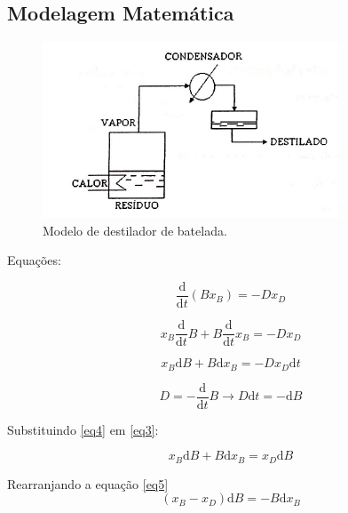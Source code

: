 \subsection{Modelagem Matemática}


\begin{figure}[H]
	\begin{center}
		\includegraphics[scale=0.7,trim={0cm -9 0 0}]{figuras/ladeq/destil/modelo}
		\vspace{-20pt}
		\caption{Modelo de destilador de batelada.}
		\label{ladeq/batelada}
	\end{center}
\end{figure}

Equações:


\begin{equation}\label{eq1}
\frac{\mathrm{d} }{\mathrm{d} t}(Bx_{B}) = -Dx_{D}
\end{equation}

\begin{equation}\label{eq2}
x_{B} \frac{\mathrm{d} }{\mathrm{d} t}B + B\frac{\mathrm{d} }{\mathrm{d} t}x_{B} = -Dx_{D}
\end{equation}

\begin{equation}\label{eq3}
x_{B} \mathrm{d} B + B \mathrm{d} x_{B} = -Dx_{D}\mathrm{d}t
\end{equation}

\begin{equation}\label{eq4}
D = -\frac{\mathrm{d} }{\mathrm{d} t}B \rightarrow D \mathrm{d} t = -\mathrm{d} B
\end{equation}

Substituindo \ref{eq4} em \ref{eq3}:

\begin{equation}\label{eq5}
x_{B}\mathrm{d} B + B \mathrm{d} x_{B} = x_{D} \mathrm{d}B
\end{equation}

Rearranjando a equação \ref{eq5}
\begin{equation}\label{eq6}
(x_{B} - x_{D}) \mathrm{d}B = - B\mathrm{d} x_{B}
\end{equation}

